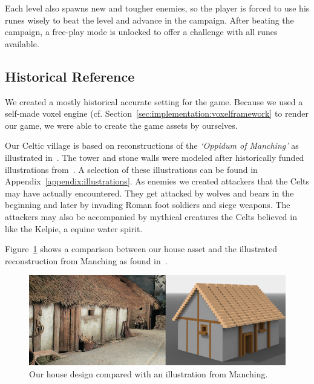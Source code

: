 Each level also spawns new and tougher enemies, so the player is forced to use his runes wisely to beat the level and advance in the campaign.
After beating the campaign, a free-play mode is unlocked to offer a challenge with all runes available.


\subsection{Historical Reference}
\label{sec:game_design:subsec:history}

We created a mostly historical accurate setting for the game. Because we used a self-made voxel engine (cf. Section~\ref{sec:implementation:voxelframework} to render our game, we were able to create the game assets by ourselves.

Our Celtic village is based on reconstructions of the \textit{`Oppidum of Manching'} as illustrated in~\cite{kraemer-oppidum-maching}. The tower and stone walls were modeled after historically funded illustrations from~\cite{kraemer-oppidum-maching}\cite{rieckhoff-walls1}\cite{rieckhoff-walls2}\cite{rieckhoff-tower}. A selection of these illustrations can be found in Appendix~\ref{appendix:illustrations}. As enemies we created attackers that the Celts may have actually encountered.
They get attacked by wolves and bears in the beginning and later by invading Roman foot soldiers and siege weapons.
The attackers may also be accompanied by mythical creatures the Celts believed in like the Kelpie, a equine water spirit.

Figure~\ref{fig:house-comparison} shows a comparison between our house asset and the illustrated reconstruction from Manching as found in~\cite{kraemer-oppidum-maching}.

\begin{figure}[ht]
	\centering
	\includegraphics[width=\linewidth]{figures/house_comparison.png}
	\caption{Our house design compared with an illustration from Manching.}
	\label{fig:house-comparison}
\end{figure}







